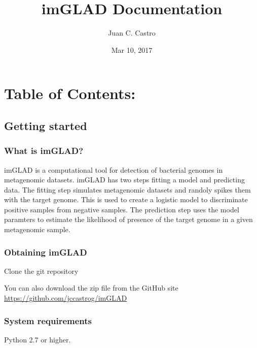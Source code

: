 \documentclass[letterpaper,10pt,english]{sphinxmanual}
\title{imGLAD Documentation}
\date{Mar 10, 2017}
\author{Juan C. Castro}
\begin{document}
\maketitle
\tableofcontents
{}\label{index::doc}



\chapter{Table of Contents:}
\label{index:imglad-bacterial-genome-detection-in-metagenomic-datasets}\label{index:table-of-contents}

\section{Getting started}
\label{introduction:getting-started}\label{introduction::doc}

\subsection{What is imGLAD?}
\label{introduction:what-is-imglad}
imGLAD is a computational tool for detection of bacterial genomes in metagenomic datasets. imGLAD has two steps fitting a model and predicting data. The fitting step simulates metagenomic datasets and randoly spikes them with the target genome. This is used to create a logistic model to discriminate positive samples from negative samples. The prediction step uses the model paramters to estimate the likelihood of presence of the target genome in a given metagenomic sample.


\subsection{Obtaining imGLAD}
\label{introduction:obtaining-imglad}
Clone the git repository
\begin{quote}

\end{quote}

You can also download the zip file from the GitHub site \url{https://github.com/jccastrog/imGLAD}


\subsection{System requirements}
\label{introduction:system-requirements}
Python 2.7 or higher.
\end{document}
